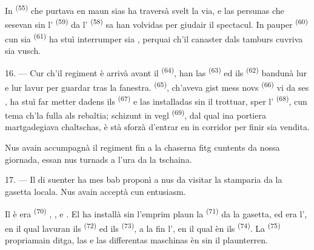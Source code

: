 \VUsaut{3.0mm}

In  \textsuperscript{(55)} che purtava en maun sias
 ha traversà svelt la via, e las persunas che sesevan sin
l' \textsuperscript{(59)} da l' \textsuperscript{(58)} sa han
volvidas per giudair il spectacul. In pauper 
\textsuperscript{(60)} cun sia  \textsuperscript{(61)} ha stuì interrumper
sia , perquai ch'il canaster dals tamburs cuvriva sia vusch.

16. --- Cur ch'il regiment è arrivà avant il 
\textsuperscript{(64)}, han las  \textsuperscript{(63)} ed ils 
\textsuperscript{(62)} bandunà lur  e lur lavur per guardar tras
la fanestra.  \textsuperscript{(65)}, ch'aveva gist mess novs
 \textsuperscript{(66)} vi da ses , ha stuì far metter dadens
ils  \textsuperscript{(67)} e las  installadas sin il trottuar,
sper l' \textsuperscript{(68)}, cun tema ch'la fulla als
rebaltia; schizunt in vegl  \textsuperscript{(69)}, dal qual ina portiera
martgadegiava chaltschas, è stà sforzà d'entrar en in corridor per finir sia vendita.

Nus avain accumpagnà il regiment fin a la chaserna  fitg cuntents da nossa
giornada, essan nus turnads a l'ura da la tschaina.

\VUsaut{3.0mm}

17. --- Il di suenter ha mes bab proponì a nus da visitar la stamparia da la gasetta
locala. Nus avain acceptà cun entusiasm.

Il  è era  \textsuperscript{(70)} , ,  e .
El ha installà sin l'emprim plaun la  \textsuperscript{(71)} da la gasetta,
ed era l', en il qual lavuran ils 
\textsuperscript{(72)} ed ils  \textsuperscript{(73)}, a la fin
l', en il qual èn ils 
\textsuperscript{(74)}. La  \textsuperscript{(75)} propriamain ditga, las
 e las differentas maschinas èn sin il plaunterren.

